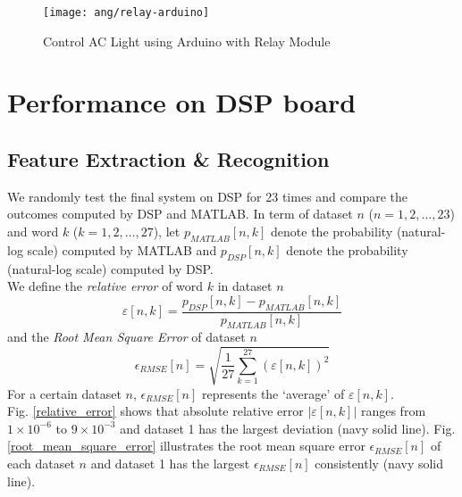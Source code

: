 \begin{figure}[H]
\centering
\texttt{[image: ang/relay-arduino]}
\caption{Control AC Light using Arduino with Relay Module \cite{relay-arduino}}
\label{relay-arduino}
\end{figure}


\section{Performance on DSP board}

\subsection{Feature Extraction \& Recognition}

We randomly test the final system on DSP for 23 times and compare the outcomes computed by DSP and MATLAB. In term of dataset $n$ ($n = 1, 2, \dots, 23$) and word $k$ ($k = 1, 2, \dots, 27$), let $p_{MATLAB}[n, k]$ denote the probability (natural-log scale) computed by MATLAB and $p_{DSP}[n, k]$ denote the probability (natural-log scale) computed by DSP.\\

We define the \textit{relative error} of word $k$ in dataset $n$
\begin{equation}
\varepsilon[n, k] = \frac{p_{DSP}[n, k] - p_{MATLAB}[n, k]}{p_{MATLAB}[n, k]}
\end{equation}
and the \textit{Root Mean Square Error} of dataset $n$
\begin{equation}
\epsilon_{RMSE}[n] = \sqrt{\frac{1}{27} \sum_{k = 1}^{27} (\varepsilon[n, k])^2}
\end{equation}
For a certain dataset $n$, $\epsilon_{RMSE}[n]$ represents the `average' of $\varepsilon[n, k]$.\\

Fig. \ref{relative_error} shows that absolute relative error $|\varepsilon[n, k]|$ ranges from $1 \times 10^{-6}$ to $9 \times 10^{-3}$ and dataset 1 has the largest deviation (\textcolor{navy_matlab}{navy solid line}). Fig. \ref{root_mean_square_error} illustrates the root mean square error $\epsilon_{RMSE}[n]$ of each dataset $n$ and dataset 1 has the largest $\epsilon_{RMSE}[n]$ consistently (\textcolor{navy_matlab}{navy solid line}).

